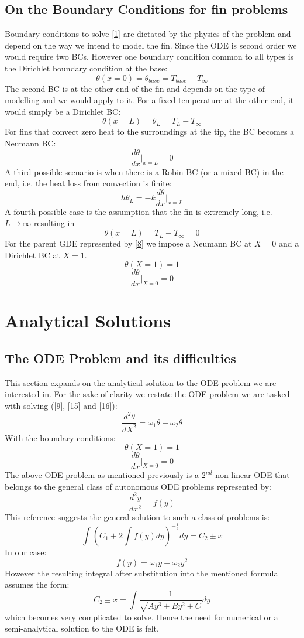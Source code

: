 \documentclass[12pt]{article}
\begin{document}
\subsection{On the Boundary Conditions for fin problems}
Boundary conditions to solve \eqref{1} are dictated by the physics of the problem and depend on the way we intend to model the fin. Since the ODE is second order we would require two BCs. However one boundary condition common to all types is the Dirichlet boundary condition at the base:
\[
\theta(x=0) = \theta_{base} = T_{base} - T_\infty \tag{10} \label{10}
\]
The second BC is at the other end of the fin and depends on the type of modelling and we would apply to it. For a fixed temperature at the other end, it would simply be a Dirichlet BC:
\[
\theta (x= L) = \theta_L = T_{L} - T_\infty \tag{11} \label{11}
\]
For fins that convect zero heat to the surroundings at the tip, the BC becomes a Neumann BC: 
\[
\frac{d\theta}{dx}\Bigr|_{x=L} = 0 \tag{12} \label{12}
\]
A third possible scenario is when there is a Robin BC (or a mixed BC) in the end, i.e. the heat loss from convection is finite: 
\[
h\theta_L = -k\frac{d\theta}{dx}\Bigr|_{x=L} \tag{13} \label{13}
\]
A fourth possible case is the assumption that the fin is extremely long, i.e. $L\to\infty$ resulting in \[
\theta (x=L) = T_L-T_\infty = 0 \tag{14} \label{14}  
\]
For the parent GDE represented by \eqref{8} we impose a Neumann BC at $X=0$ and a Dirichlet BC at $X=1$.
\[
\theta (X=1) = 1 \tag{15} \label{15}
\]
\[
\frac{d\theta}{dx}\Bigr|_{X=0} = 0 \tag{16} \label{16}
\]
\section{Analytical Solutions}\label{sec:analytical}
\subsection{The ODE Problem and its difficulties}
This section expands on the analytical solution to the ODE problem we are interested in. For the sake of clarity we restate the ODE problem we are tasked with solving (\eqref{9}, \eqref{15} and \eqref{16}):
\[  
\frac{d^2\theta}{dX^2} = \omega_1 \theta + \omega_2 \theta \tag{9} 
\]
With the boundary conditions:
\[
\theta (X=1) = 1 \tag{15} 
\]
\[
\frac{d\theta}{dx}\Bigr|_{X=0} = 0 \tag{16} 
\]
The above ODE problem as mentioned previously is a $2^{nd}$ non-linear ODE that belongs to the general class of autonomous ODE problems represented by:
\[
\frac{d^2y}{dx^2} = f(y) \tag{17} \label{17}
\]
\href{http://eqworld.ipmnet.ru/en/solutions/ode/ode0301.pdf}{This reference} suggests the general solution to such a class of problems is: 
\[
\int \left(C_1 + 2\int f(y)dy\right)^{-\frac{1}{2}}dy = C_2 \pm x \tag{18} \label{18}
\]
In our case:
\[
f(y) = \omega_1 y + \omega_2 y^2 \tag{19} \label{19}
\]
However the resulting integral after substitution into the mentioned formula assumes the form: 
\[
C_2 \pm x = \int \frac{1}{\sqrt{Ay^3 + By^2 + C}} dy \tag{20} \label{20} 
\]
which becomes very complicated to solve. Hence the need for numerical or a semi-analytical solution to the ODE is felt.
\end{document}
